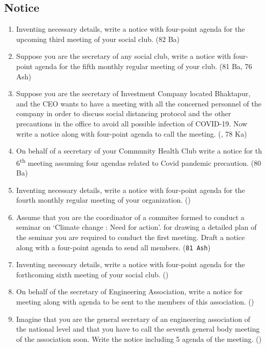 \documentclass[12pt]{article}
\newcommand{\super}[1]{\textsuperscript{#1}}
\begin{document}
  \subsection{Notice}
    \begin{enumerate}
      \item Inventing necessary details, write a notice with four-point agenda for the upcoming third meeting of your social club. \hfill (82 Ba)

      \item Suppose you are the secretary of any social club, write a notice with four-point agenda for the fifth monthly regular meeting of your club. \hfill (81 Ba, 76 Ash)

      \item Suppose you are the secretary of Investment Company located Bhaktapur, and the CEO wants to have a meeting with all the concerned personnel of the company in order to discuss social distancing protocol and the other precautions in the office to avoid all possible infection of COVID-19. Now write a notice along with four-point agenda to call the meeting. \hfill (, 78 Ka)

      \item On behalf of a secretary of your Community Health Club write a notice for th 6\super{th} meeting assuming four agendas related to Covid pandemic precaution. \hfill (80 Ba)

      \item Inventing necessary details, write a notice with four-point agenda for the fourth monthly regular meeting of your organization. \hfill ()

      \item Assume that you are the coordinator of a commitee formed to conduct a seminar on `Climate change : Need for action'. for drawing a detailed plan of the seminar you are required to conduct the first meeting. Draft a notice along with a four-point agenda to send all members. \hfill (\texttt{81 Ash})

      \item Inventing necessary details, write a notice with four-point agenda for the forthcoming sixth meeting of your social club. \hfill ()

      \item On behalf of the secretary of Engineering Association, write a notice for meeting along with agenda to be sent to the members of this association. \hfill ()

      \item Imagine that you are the general secretary of an engineering association of the national level and that you have to call the seventh general body meeting of the association soon. Write the notice including 5 agenda of the meeting. \hfill ()
    \end{enumerate}
\end{document}
